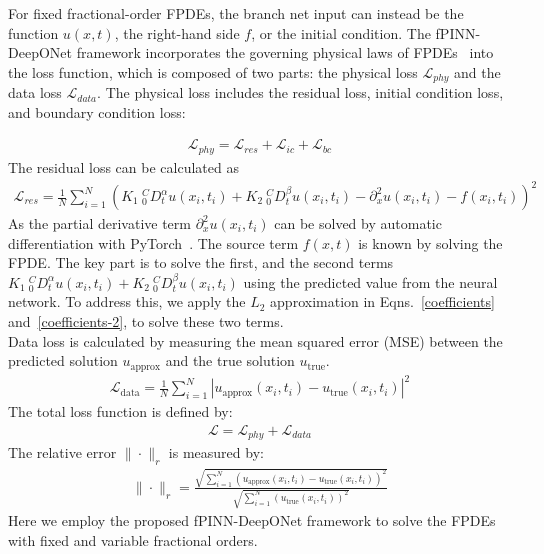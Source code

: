 \documentclass[11pt]{article}
\providecommand{\bh}[1]{#1}
\begin{document}
For fixed fractional-order FPDEs, the branch net input can instead be the function $u(x,t)$, the right-hand side $f$, or the initial condition. The fPINN-DeepONet framework incorporates the governing physical laws of FPDEs~\cite{lu2023nsga} into the loss function, which is composed of two parts: the physical loss $\mathcal{L}_{phy}$ and the data loss $\mathcal{L}_{data}$. The physical loss includes the residual loss, initial condition loss, and boundary condition loss:

\begin{eqnarray} 
\mathcal{L}_{phy} =  \mathcal{L}_{res} + \mathcal{L}_{ic} + \mathcal{L}_{bc}
\end{eqnarray}
The residual loss can be calculated as 
\begin{eqnarray}
  \mathcal{L}_{res} = \frac{1}{N} \sum_{i=1}^{N} \left( K_1\  _0^{C}D_t^{\alpha}u(x_i,t_i) + K_2\  _0^{C}D_t^{\beta}u(x_i,t_i) - \partial_x^{2}u(x_i,t_i) - f(x_i,t_i) \right)^2 
\end{eqnarray}
\bh{As the partial derivative term $\partial_x^{2}u(x_i,t_i)$ can be solved by automatic differentiation with PyTorch~\cite{paszke2017automatic}. The source term $f(x,t)$ is known by solving the FPDE. The key part is to solve the first, and the second terms $K_1\  _0^{C}D_t^{\alpha}u(x_i,t_i) + K_2\  _0^{C}D_t^{\beta}u(x_i,t_i)$ using the predicted value from the neural network. To address this, we apply the $L_2$ approximation in Eqns.~\ref{coefficients} and~\ref{coefficients-2}, to solve these two terms. }\\
Data loss is calculated by measuring the mean squared error (MSE) between the predicted solution $u_\text{approx}$ and the true solution $u_\text{true}$.
\begin{eqnarray}
\mathcal{L}_{\text{data}} = \frac{1}{N} \sum_{i=1}^{N} \left| u_\text{approx}(x_i,t_i) - u_\text{true}(x_i,t_i) \right|^2
\end{eqnarray}
The total loss function is defined by:
\begin{eqnarray} \label{fPINN-DeepONet loss function}
\mathcal{L} =   \mathcal{L}_{phy} + \mathcal{L}_{data} 
\end{eqnarray}
The relative error $\| \cdot \|_r$ is measured by:
\begin{eqnarray}
\| \cdot \|_r = \frac{\sqrt{\sum_{i=1}^{N} \left( u_{\text{approx}}(x_i,t_i) - u_{\text{true}}(x_i,t_i) \right)^2}}{\sqrt{\sum_{i=1}^{N} \left( u_{\text{true}}(x_i,t_i) \right)^2}} 
\label{mse_error}
\end{eqnarray}
Here we employ the proposed fPINN-DeepONet framework to solve the FPDEs with fixed and variable fractional orders.
\newpage
\end{document}
